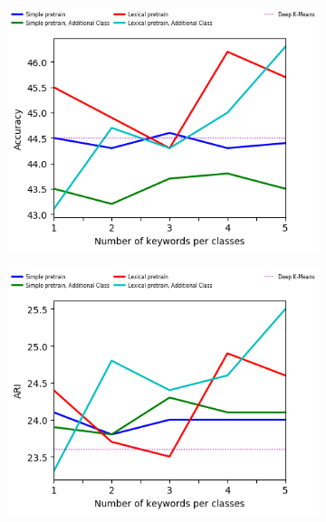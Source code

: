 \begin{figure}[!h]
  \begin{subfigure}[b]{\textwidth}
    \centering
    \includegraphics[scale=0.82]{parts/res/dat_file/acc/20NEWS_noisy_ACC.png}     
  \end{subfigure}
  \begin{subfigure}[b]{\textwidth}
    \centering
    \includegraphics[scale=0.82]{parts/res/dat_file/ari/20NEWS_noisy_ARI.png}     
  \end{subfigure}
  \begin{subfigure}[b]{\textwidth}
    \centering

\end{subfigure}
\end{figure}
